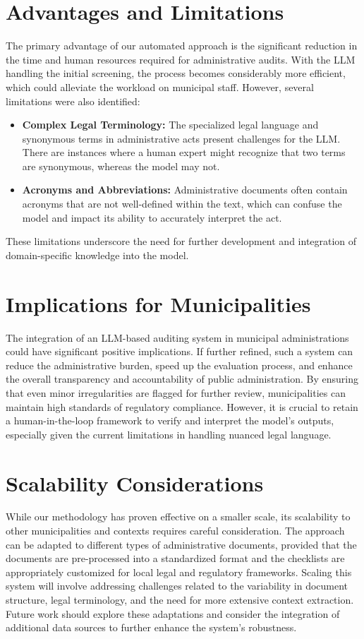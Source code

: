 \documentclass[../main.tex]{subfiles}
\begin{document}
\section{Advantages and Limitations}
The primary advantage of our automated approach is the significant reduction in the time and human resources required for administrative audits. With the LLM handling the initial screening, the process becomes considerably more efficient, which could alleviate the workload on municipal staff. However, several limitations were also identified:
\begin{itemize}
    \item \textbf{Complex Legal Terminology:} The specialized legal language and synonymous terms in administrative acts present challenges for the LLM. There are instances where a human expert might recognize that two terms are synonymous, whereas the model may not.
    \item \textbf{Acronyms and Abbreviations:} Administrative documents often contain acronyms that are not well-defined within the text, which can confuse the model and impact its ability to accurately interpret the act.
\end{itemize}
These limitations underscore the need for further development and integration of domain-specific knowledge into the model.

\section{Implications for Municipalities}
The integration of an LLM-based auditing system in municipal administrations could have significant positive implications. If further refined, such a system can reduce the administrative burden, speed up the evaluation process, and enhance the overall transparency and accountability of public administration. By ensuring that even minor irregularities are flagged for further review, municipalities can maintain high standards of regulatory compliance. However, it is crucial to retain a human-in-the-loop framework to verify and interpret the model's outputs, especially given the current limitations in handling nuanced legal language.

\section{Scalability Considerations}
While our methodology has proven effective on a smaller scale, its scalability to other municipalities and contexts requires careful consideration. The approach can be adapted to different types of administrative documents, provided that the documents are pre-processed into a standardized format and the checklists are appropriately customized for local legal and regulatory frameworks. Scaling this system will involve addressing challenges related to the variability in document structure, legal terminology, and the need for more extensive context extraction. Future work should explore these adaptations and consider the integration of additional data sources to further enhance the system's robustness.
\end{document}
